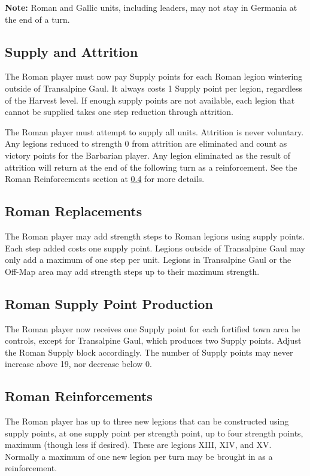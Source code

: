 \textbf{Note:} Roman and Gallic units, including leaders, may not stay in Germania at the end of a turn.

\subsection{Supply and Attrition}
\label{supply_and_attrition}
\par
The Roman player must now pay Supply points for each Roman legion wintering outside of Transalpine Gaul. It always costs 1 Supply point per legion, regardless of the Harvest level. If enough supply points are not available, each legion that cannot be supplied takes one step reduction through attrition.

The Roman player must attempt to supply all units. Attrition is never voluntary. Any legions reduced to strength 0 from attrition are eliminated and count as victory points for the Barbarian player. Any legion eliminated as the result of attrition will return at the end of the following turn as a reinforcement. See the Roman Reinforcements section at \ref{roman_reinforcements} for more details.

\subsection{Roman Replacements}
\par
The Roman player may add strength steps to Roman legions using supply points. Each step added costs one supply point. Legions outside of Transalpine Gaul may only add a maximum of one step per unit. Legions in Transalpine Gaul or the Off-Map area may add strength steps up to their maximum strength. 

\subsection{Roman Supply Point Production}
\par
The Roman player now receives one Supply point for each fortified town area he controls, except for Transalpine Gaul, which produces two Supply points. Adjust the Roman Supply block accordingly. The number of Supply points may never increase above 19, nor decrease below 0.

\subsection{Roman Reinforcements}\label{roman_reinforcements}
\par
The Roman player has up to three new legions that can be constructed using supply points, at one supply point per strength point, up to four strength points, maximum (though less if desired). These are legions XIII, XIV, and XV. Normally a maximum of one new legion per turn may be brought in as a reinforcement.

